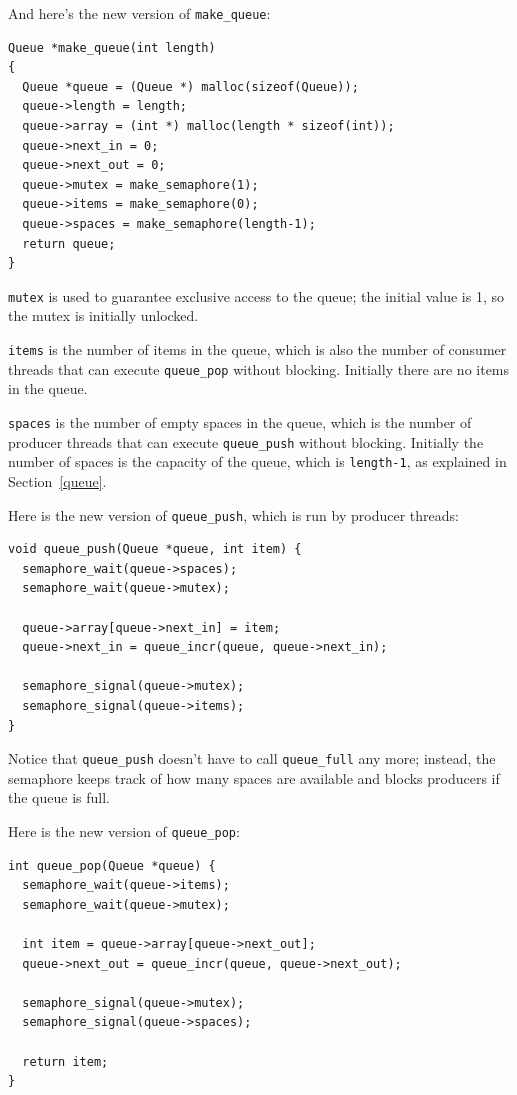 \documentclass[12pt]{book}
\begin{document}
And here's the new version of \verb"make_queue":

\begin{verbatim}
Queue *make_queue(int length)
{
  Queue *queue = (Queue *) malloc(sizeof(Queue));
  queue->length = length;
  queue->array = (int *) malloc(length * sizeof(int));
  queue->next_in = 0;
  queue->next_out = 0;
  queue->mutex = make_semaphore(1);
  queue->items = make_semaphore(0);
  queue->spaces = make_semaphore(length-1);
  return queue;
}
\end{verbatim}

{\tt mutex} is used to guarantee exclusive access to the queue;
the initial value is 1, so the mutex is
initially unlocked.

{\tt items} is the number of items in the queue, which is also the number
of consumer threads that can execute \verb"queue_pop" without blocking.
Initially there are no items in the queue.

{\tt spaces} is the number of empty spaces in the queue, which is the
number of producer threads that can execute \verb"queue_push" without
blocking.  Initially the number of spaces is the capacity of the queue,
which is {\tt length-1}, as explained in Section~\ref{queue}.

Here is the new version of \verb"queue_push", which is run by
producer threads:

\begin{verbatim}
void queue_push(Queue *queue, int item) {
  semaphore_wait(queue->spaces);
  semaphore_wait(queue->mutex);

  queue->array[queue->next_in] = item;
  queue->next_in = queue_incr(queue, queue->next_in);

  semaphore_signal(queue->mutex);
  semaphore_signal(queue->items);
}
\end{verbatim}

Notice that \verb"queue_push" doesn't have to call
\verb"queue_full" any more; instead, the semaphore keeps track of
how many spaces are available and blocks producers if the queue
is full.

Here is the new version of \verb"queue_pop":

\begin{verbatim}
int queue_pop(Queue *queue) {
  semaphore_wait(queue->items);
  semaphore_wait(queue->mutex);
  
  int item = queue->array[queue->next_out];
  queue->next_out = queue_incr(queue, queue->next_out);

  semaphore_signal(queue->mutex);
  semaphore_signal(queue->spaces);

  return item;
}
\end{verbatim}
\end{document}
